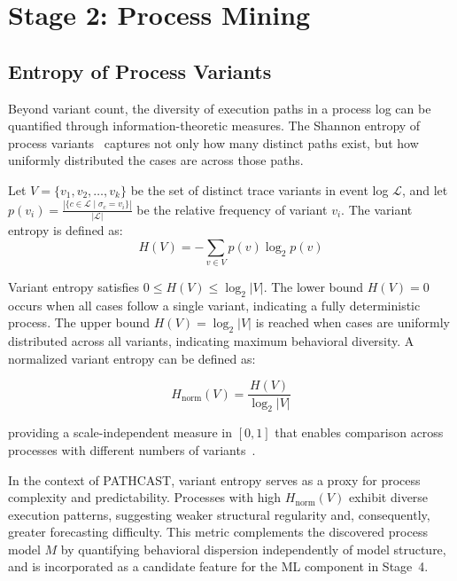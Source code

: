 \section{Stage 2: Process Mining}
\label{sec:stage2}

\subsection{Entropy of Process Variants}
\label{sec:variant-entropy}

Beyond variant count, the diversity of execution paths in a process log
can be quantified through information-theoretic measures. The Shannon
entropy of process variants~\cite{shannon1948mathematical} captures not
only how many distinct paths exist, but how uniformly distributed the
cases are across those paths.

\begin{definition}
\label{def:variant-entropy}
Let $V = \{v_1, v_2, \ldots, v_k\}$ be the set of distinct trace variants
in event log $\mathcal{L}$, and let $p(v_i) = \frac{|\{c \in \mathcal{L}
\mid \sigma_c = v_i\}|}{|\mathcal{L}|}$ be the relative frequency of variant
$v_i$. The variant entropy is defined as:
\begin{equation}
H(V) = -\sum_{v \in V} p(v) \log_2 p(v)
\label{eq:variant-entropy}
\end{equation}
\end{definition}

Variant entropy satisfies $0 \leq H(V) \leq \log_2 |V|$. The lower bound
$H(V) = 0$ occurs when all cases follow a single variant, indicating a
fully deterministic process. The upper bound $H(V) = \log_2 |V|$ is reached
when cases are uniformly distributed across all variants, indicating maximum
behavioral diversity. A normalized variant entropy can be defined as:

\begin{equation}
H_{\text{norm}}(V) = \frac{H(V)}{\log_2 |V|}
\label{eq:variant-entropy-norm}
\end{equation}

\noindent providing a scale-independent measure in $[0, 1]$ that enables
comparison across processes with different numbers of
variants~\cite{aalst2016process}.

In the context of PATHCAST, variant entropy serves as a proxy for
process complexity and predictability. Processes with high $H_{\text{norm}}(V)$
exhibit diverse execution patterns, suggesting weaker structural regularity
and, consequently, greater forecasting difficulty. This metric complements
the discovered process model $M$ by quantifying behavioral dispersion
independently of model structure, and is incorporated as a candidate feature
for the ML component in Stage~4.

